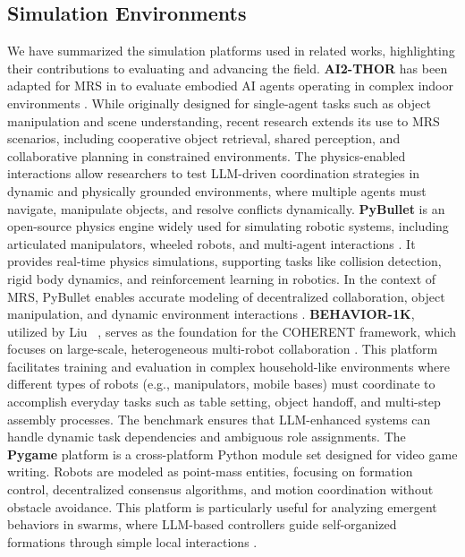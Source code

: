 \subsection{Simulation Environments} 
 We have summarized the simulation platforms used in related works, highlighting their contributions to evaluating and advancing the field.
\textbf{AI2-THOR} has been adapted for MRS in \cite{chen_scalable_2024, kannan_smart-llm_2024, wang_safe_2024, xu_scaling_2024} to evaluate embodied AI agents operating in complex indoor environments \cite{ai2thor}. While originally designed for single-agent tasks such as object manipulation and scene understanding, recent research extends its use to MRS scenarios, including cooperative object retrieval, shared perception, and collaborative planning in constrained environments. The physics-enabled interactions allow researchers to test LLM-driven coordination strategies in dynamic and physically grounded environments, where multiple agents must navigate, manipulate objects, and resolve conflicts dynamically.
\textbf{PyBullet} is an open-source physics engine widely used for simulating robotic systems, including articulated manipulators, wheeled robots, and multi-agent interactions \cite{coumans2021}. It provides real-time physics simulations, supporting tasks like collision detection, rigid body dynamics, and reinforcement learning in robotics. In the context of MRS, PyBullet enables accurate modeling of decentralized collaboration, object manipulation, and dynamic environment interactions \cite{yu_mhrc_2024}.
\textbf{BEHAVIOR-1K}, utilized by Liu \etal~\cite{liu_coherent_2024}, serves as the foundation for the COHERENT framework, which focuses on large-scale, heterogeneous multi-robot collaboration \cite{li2023behavior}. This platform facilitates training and evaluation in complex household-like environments where different types of robots (e.g., manipulators, mobile bases) must coordinate to accomplish everyday tasks such as table setting, object handoff, and multi-step assembly processes. The benchmark ensures that LLM-enhanced systems can handle dynamic task dependencies and ambiguous role assignments.
The \textbf{Pygame} platform is a cross-platform Python module set designed for video game writing. Robots are modeled as point-mass entities, focusing on formation control, decentralized consensus algorithms, and motion coordination without obstacle avoidance. This platform is particularly useful for analyzing emergent behaviors in swarms, where LLM-based controllers guide self-organized formations through simple local interactions \cite{venkatesh_zerocap_2024}.
